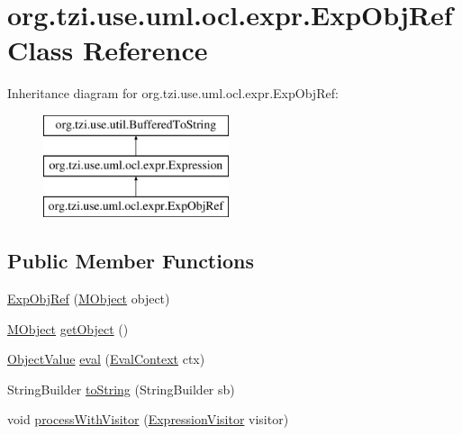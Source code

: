 \hypertarget{classorg_1_1tzi_1_1use_1_1uml_1_1ocl_1_1expr_1_1_exp_obj_ref}{\section{org.\-tzi.\-use.\-uml.\-ocl.\-expr.\-Exp\-Obj\-Ref Class Reference}
\label{classorg_1_1tzi_1_1use_1_1uml_1_1ocl_1_1expr_1_1_exp_obj_ref}
}
Inheritance diagram for org.\-tzi.\-use.\-uml.\-ocl.\-expr.\-Exp\-Obj\-Ref\-:\begin{figure}[H]
\begin{center}
\leavevmode
\includegraphics[height=3.000000cm]{classorg_1_1tzi_1_1use_1_1uml_1_1ocl_1_1expr_1_1_exp_obj_ref}
\end{center}
\end{figure}
\subsection*{Public Member Functions}
\begin{DoxyCompactItemize}
\item 
\hyperlink{classorg_1_1tzi_1_1use_1_1uml_1_1ocl_1_1expr_1_1_exp_obj_ref_ae2491c1bd2aa5272d511eec0bbdf9b88}{Exp\-Obj\-Ref} (\hyperlink{interfaceorg_1_1tzi_1_1use_1_1uml_1_1sys_1_1_m_object}{M\-Object} object)
\item 
\hyperlink{interfaceorg_1_1tzi_1_1use_1_1uml_1_1sys_1_1_m_object}{M\-Object} \hyperlink{classorg_1_1tzi_1_1use_1_1uml_1_1ocl_1_1expr_1_1_exp_obj_ref_ae93953471b57c04eb9a58461ce1ee109}{get\-Object} ()
\item 
\hyperlink{classorg_1_1tzi_1_1use_1_1uml_1_1ocl_1_1value_1_1_object_value}{Object\-Value} \hyperlink{classorg_1_1tzi_1_1use_1_1uml_1_1ocl_1_1expr_1_1_exp_obj_ref_a209c0aeedf46f8a28eb2666e7901d800}{eval} (\hyperlink{classorg_1_1tzi_1_1use_1_1uml_1_1ocl_1_1expr_1_1_eval_context}{Eval\-Context} ctx)
\item 
String\-Builder \hyperlink{classorg_1_1tzi_1_1use_1_1uml_1_1ocl_1_1expr_1_1_exp_obj_ref_a590deaa150c26b07e3140e948986182e}{to\-String} (String\-Builder sb)
\item 
void \hyperlink{classorg_1_1tzi_1_1use_1_1uml_1_1ocl_1_1expr_1_1_exp_obj_ref_a58c3378028bedd83be8072c1c6c2cca6}{process\-With\-Visitor} (\hyperlink{interfaceorg_1_1tzi_1_1use_1_1uml_1_1ocl_1_1expr_1_1_expression_visitor}{Expression\-Visitor} visitor)
\end{DoxyCompactItemize}
